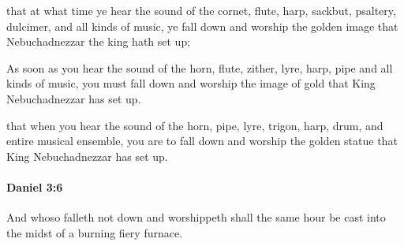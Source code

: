 			\begin{versebox}
					\item[BHS] 
					\item[LXX] 
					\item[ASV] that at what time ye hear the sound of the cornet, flute, harp, sackbut, psaltery, dulcimer, and all kinds of music, ye fall down and worship the golden image that Nebuchadnezzar the king hath set up;
					\item[NIV] As soon as you hear the sound of the horn, flute, zither, lyre, harp, pipe and all kinds of music, you must fall down and worship the image of gold that King Nebuchadnezzar has set up.
					\item[NRSV] that when you hear the sound of the horn, pipe, lyre, trigon, harp, drum, and entire musical ensemble, you are to fall down and worship the golden statue that King Nebuchadnezzar has set up.
			\end{versebox}

		\paragraph{Daniel 3:6} %
			\label{DANIEL-3-6}

			And whoso falleth not down and worshippeth shall the same hour be cast into the midst of a burning fiery furnace.

